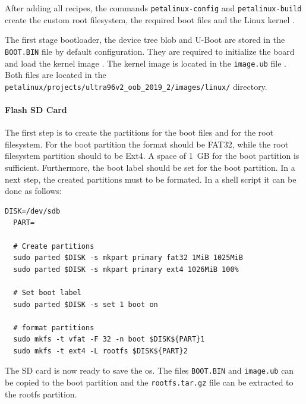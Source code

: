 After adding all recipes, the commands \texttt{petalinux-config} and \texttt{petalinux-build} create the custom root filesystem, the required boot files and the Linux kernel \cite{petalinux_user_guide}.

The first stage bootloader, the device tree blob and U-Boot are stored in the \texttt{BOOT.BIN} file by default configuration.
They are required to initialize the board and load the kernel image \cite{xilinx_wiki_boot}.
The kernel image is located in the \texttt{image.ub} file \cite{xilinx_wiki_uboot}.
Both files are located in the \texttt{petalinux/projects/ultra96v2\_oob\_2019\_2/images/linux/} directory.

\paragraph{Flash SD Card}
The first step is to create the partitions for the boot files and for the root filesystem.
For the boot partition the format should be FAT32, while the root filesystem partition should to be Ext4.
A space of \SI{1}{GB} for the boot partition is sufficient.
Furthermore, the boot label should be set for the boot partition.
In a next step, the created partitions must to be formated.
In a shell script it can be done as follows:

\begin{lstlisting}[style=bash, caption={Prepare SD card}, label=lst:create_partitions]
  DISK=/dev/sdb
  PART=

  # Create partitions
  sudo parted $DISK -s mkpart primary fat32 1MiB 1025MiB
  sudo parted $DISK -s mkpart primary ext4 1026MiB 100%

  # Set boot label
  sudo parted $DISK -s set 1 boot on

  # format partitions
  sudo mkfs -t vfat -F 32 -n boot $DISK${PART}1
  sudo mkfs -t ext4 -L rootfs $DISK${PART}2
\end{lstlisting}

The SD card is now ready to save the \acrshort{os}.
The files \texttt{BOOT.BIN} and \texttt{image.ub} can be copied to the boot partition and the \texttt{rootfs.tar.gz} file can be extracted to the rootfs partition.

